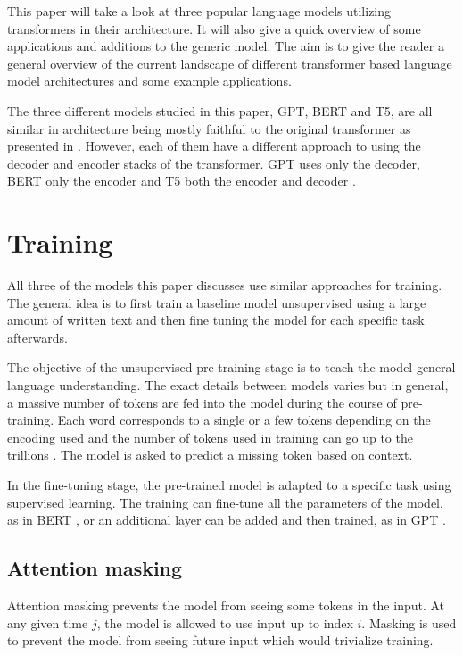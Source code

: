 \documentclass[twoside]{article}
\begin{document}
This paper will take a look at three popular language models utilizing
transformers in their architecture. It will also give a quick overview
of some applications and additions to the generic model. The aim is to
give the reader a general overview of the current landscape of different
transformer based language model architectures and some example applications.

The three different models studied in this paper, GPT, BERT and T5, are all similar in architecture 
being mostly faithful to the original transformer as presented in 
\cite{vaswani_attention_2017}. However, each of them have a different approach
to using the decoder and encoder stacks of the transformer. GPT uses only
the decoder, BERT only the encoder and T5 both the encoder and decoder
\cite{radford_improving_nodate,devlin_bert_2019,raffel_exploring_2020}.

\section{Training}
All three of the models this paper discusses use similar approaches for 
training. The general idea is to first train a baseline model unsupervised 
using a large amount of written text and then fine tuning the model
for each specific task afterwards. 

The objective of the unsupervised pre-training stage is to teach the model
general language understanding. The exact details between models varies but
in general, a massive number of tokens are fed into the model during the course
of pre-training. Each word corresponds to a single or a few tokens depending on 
the encoding used \cite{noauthor_pricing_nodate} and the number of tokens
used in training can go up to the trillions \cite{raffel_exploring_2020}. 
The model is asked to predict a missing token based on context. 

In the fine-tuning stage, the pre-trained model is adapted to a specific task 
using supervised learning.
The training can fine-tune all the parameters of the model, as in BERT 
\cite{devlin_bert_2019}, or an additional layer can be added and then
trained, as in GPT \cite{radford_improving_nodate}.

\subsection{Attention masking}
Attention masking prevents the model from seeing some tokens in the input. At any
given time $j$, the model is allowed to use input up to index $i$. Masking is used to prevent the model from
seeing future input which would trivialize training. \cite{raffel_exploring_2020}
\end{document}
